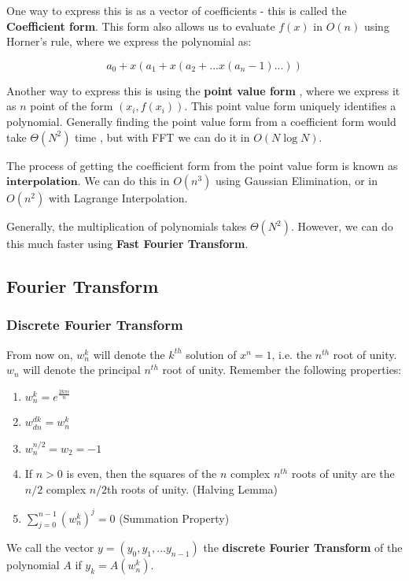 \documentclass[12pt,letterpaper]{article}
\theoremstyle{definition}
\begin{document}
One way to express this is as a vector of coefficients  - this is called the \textbf{Coefficient form}. This form also allows us to evaluate $f(x)$ in $O(n)$ using Horner's rule, where we express the polynomial as:

\[a_0 + x(a_1 + x(a_2 + ...x(a_n-1)...))\]

Another way to express this is using the \textbf{point value form} , where we express it as $n$ point of the form $(x_i,f(x_i))$. This point value form uniquely identifies a polynomial. Generally finding the point value form from a coefficient form would take $\Theta(N^2)$ time , but with FFT we can do it in $O(N\log N)$.

The process of getting the coefficient form from the point value form is known as $\textbf{interpolation}$.  We can do this in $O(n^3)$ using Gaussian Elimination, or in $O(n^2)$ with Lagrange Interpolation.

Generally, the multiplication of polynomials takes $\Theta(N^2)$. However, we can do this much faster using \textbf{Fast Fourier Transform}.

\subsection{Fourier Transform}

\subsubsection{Discrete Fourier Transform}

From now on, $w_n^k$ will denote the $k^{th}$ solution of $x^n=1$, i.e. the $n^{th}$ root of unity. $w_n$ will denote the principal $n^{th}$ root of unity. Remember the following properties:

\begin{enumerate}
  \item $w_n^k = e^{\frac{2k\pi i}{n}}$
  \item $w_{dn}^{dk} = w_{n}^k$
  \item $w_{n}^{n/2} = w_2 = -1$
  \item If $n >0$ is even, then the squares of the $n$ complex $n^{th}$ roots of unity are the $n/2$ complex $n/2$th roots of unity. (Halving Lemma)
  \item $\sum_{j=0}^{n-1} (w_{n}^{k})^j = 0$ (Summation Property)
\end{enumerate}

We call the vector $y = (y_0,y_1,...y_{n-1})$ the \textbf{discrete Fourier Transform}  of the polynomial $A$ if $y_k = A(w_n^k)$.
\end{document}
